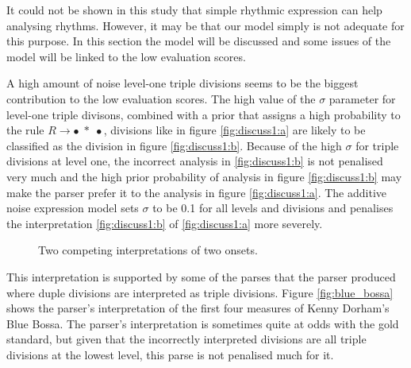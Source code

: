 It could not be shown in this study that simple rhythmic expression can help analysing rhythms. However, it may be that our model simply is not adequate for this purpose. In this section the model will be discussed and some issues of the model will be linked to the low evaluation scores.

A high amount of noise level-one triple divisions seems to be the biggest contribution to the low evaluation scores. The high value of the $\sigma$ parameter for level-one triple divisons, combined with a prior that assigns a high probability to the rule $R \rightarrow \bullet\; *\; \bullet$, divisions like in figure \ref{fig:discuss1:a} are likely to be classified as the division in figure \ref{fig:discuss1:b}. Because of the high $\sigma$ for triple divisions at level one, the incorrect analysis in \ref{fig:discuss1:b} is not penalised very much and the high prior probability of analysis in figure \ref{fig:discuss1:b} may make the parser prefer it to the analysis in figure \ref{fig:discuss1:a}. The additive noise expression model sets $\sigma$ to be 0.1 for all levels and divisions and penalises the interpretation \ref{fig:discuss1:b} of \ref{fig:discuss1:a} more severely.

\begin{figure}
\centering
{}
\caption{Two competing interpretations of two onsets.}
\label{fig:discuss1}
\end{figure}

This interpretation is supported by some of the parses that the parser produced where duple divisions are interpreted as triple divisions. Figure \ref{fig:blue_bossa} shows the parser's interpretation of the first four measures of Kenny Dorham's Blue Bossa. The parser's interpretation is sometimes quite at odds with the gold standard, but given that the incorrectly interpreted divisions are all triple divisions at the lowest level, this parse is not penalised much for it.

